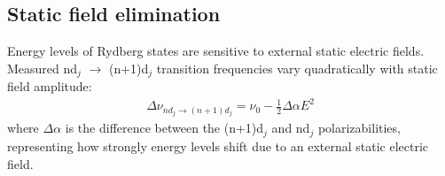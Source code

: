 \documentclass[landscape]{sciposter}
\begin{document}
\begin{multicols}{4}
\section*{\large Static field elimination}
Energy levels of Rydberg states are sensitive to external static electric fields. Measured nd$_j$ $\rightarrow$ (n+1)d$_j$ transition frequencies vary quadratically with static field amplitude:
\begin{align*}
\boxed{\Delta \nu_{nd_j \rightarrow (n+1)d_j} = \nu_{0} - \frac{1}{2} \Delta \alpha E^2}
\end{align*}
where $\Delta \alpha$ is the difference between the (n+1)d$_j$ and nd$_j$ polarizabilities, representing how strongly energy levels shift due to an external static electric field. 


\end{multicols}
\end{document}

